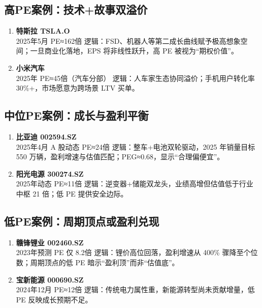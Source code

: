 \subsection{高PE案例：技术+故事双溢价}
\begin{enumerate}[leftmargin=*, nosep]
    \item \textbf{特斯拉 TSLA.O}  \\
    2025年5月 PE≈162倍  
    逻辑：FSD、机器人等第二成长曲线赋予极高想象空间；一旦商业化落地，EPS 将非线性跃升，高 PE 被视为“期权价值”。
    \item \textbf{小米汽车}  \\
    2025年 PE≈45倍（汽车分部）  
    逻辑：人车家生态协同溢价；手机用户转化率 30\%+，市场愿意为跨场景 LTV 买单。
\end{enumerate}



\subsection{中位PE案例：成长与盈利平衡}
\begin{enumerate}[leftmargin=*, nosep]
    \item \textbf{比亚迪 002594.SZ}  \\
    2025年4月 A 股动态 PE≈24倍  
    逻辑：整车+电池双轮驱动，2025 年销量目标 550 万辆，盈利增速与估值匹配；PEG≈0.68，显示“合理偏便宜”。
    \item \textbf{阳光电源 300274.SZ}  \\
    2025年动态 PE≈11倍  
    逻辑：逆变器+储能双龙头，业绩高增但估值低于行业中枢 21 倍；低 PE 提供安全边际。
\end{enumerate}

\subsection{低PE案例：周期顶点或盈利兑现}
\begin{enumerate}[leftmargin=*, nosep]
    \item \textbf{赣锋锂业 002460.SZ}  \\
    2023年预测 PE 仅 8.2倍  
    逻辑：锂价高位回落，盈利增速从 400\% 骤降至个位数；周期顶点的低 PE 暗示“盈利顶”而非“估值底”。
    \item \textbf{宝新能源 000690.SZ}  \\
    2024年12月 PE≈12倍  
    逻辑：传统电力属性重，新能源转型尚未贡献增量，低 PE 反映成长预期不足。
\end{enumerate}

